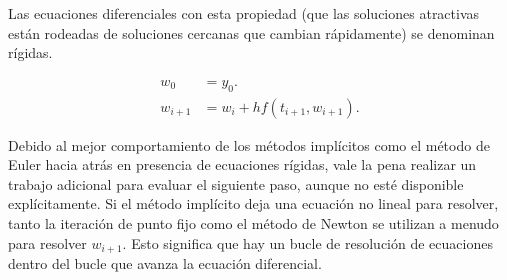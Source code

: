 Las ecuaciones diferenciales con esta propiedad (que las soluciones
atractivas están rodeadas de soluciones cercanas que cambian
rápidamente) se denominan rígidas.

\begin{align*}
    w_{0}   & =
    y_{0}.      \\
    w_{i+1} & =
    w_{i}+hf\left(t_{i+1},w_{i+1}\right).
\end{align*}

Debido al mejor comportamiento de los métodos implícitos como el
método de Euler hacia atrás en presencia de ecuaciones rígidas, vale
la pena realizar un trabajo adicional para evaluar el siguiente paso,
aunque no esté disponible explícitamente.
Si el método implícito deja una ecuación no lineal para resolver,
tanto la iteración de punto fijo como el método de Newton se
utilizan a menudo para resolver $w_{i+1}$.
Esto significa que hay un bucle de resolución de ecuaciones dentro
del bucle que avanza la ecuación diferencial.


